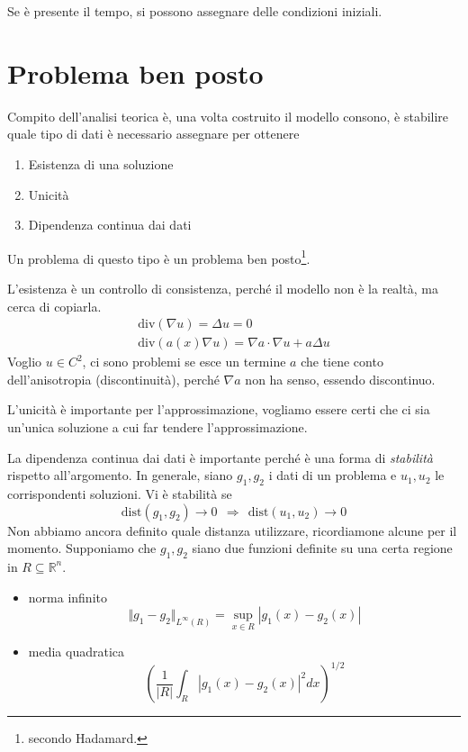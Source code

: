 \documentclass[10pt,a4paper,twoside,openright]{book}
\begin{document}
Se è presente il tempo, si possono assegnare delle condizioni iniziali.
\section{Problema ben posto}

Compito dell'analisi teorica è, una volta costruito il modello consono, è stabilire quale tipo di dati è necessario assegnare per ottenere
\begin{enumerate}
\item Esistenza di una soluzione
\item Unicità
\item Dipendenza continua dai dati
\end{enumerate}

Un problema di questo tipo è un problema ben posto\footnote{secondo Hadamard.}.



L'esistenza è un controllo di consistenza, perché il modello non è la realtà, ma cerca di copiarla.
\begin{gather*}
\mathrm{div}(\nabla u) =\Delta u=0\\
\mathrm{div}(a(x) \nabla u) =\nabla a\cdotp \nabla u+a\Delta u
\end{gather*}
Voglio $u\in C^{2}$, ci sono problemi se esce un termine $a$ che tiene conto dell'anisotropia (discontinuità), perché $\nabla a$ non ha senso, essendo discontinuo.



L'unicità è importante per l'approssimazione, vogliamo essere certi che ci sia un'unica soluzione a cui far tendere l'approssimazione.



La dipendenza continua dai dati è importante perché è una forma di \textit{stabilità} rispetto all'argomento. In generale, siano $g_{1},g_{2}$ i dati di un problema e $u_{1},u_{2}$ le corrispondenti soluzioni. Vi è stabilità se
\begin{equation*}
\text{dist}(g_{1},g_{2})\rightarrow 0\ \ \Rightarrow \ \ \text{dist}(u_{1},u_{2})\rightarrow 0
\end{equation*}
Non abbiamo ancora definito quale distanza utilizzare, ricordiamone alcune per il momento. Supponiamo che $g_{1},g_{2}$ siano due funzioni definite su una certa regione in $R\subseteq \mathbb{R}^{n}$.
\begin{itemize}
\item norma infinito\begin{equation*}
\Vert g_{1} -g_{2}\Vert _{L^{\infty }(R)} =\sup _{x\in R}| g_{1}(x) -g_{2}(x)| 
\end{equation*}
\item media quadratica\begin{equation*}
\left(\frac{1}{| R| }\int _{R}| g_{1}(x) -g_{2}(x)| ^{2} dx\right)^{1/2}
\end{equation*}
\end{itemize}
\end{document}
